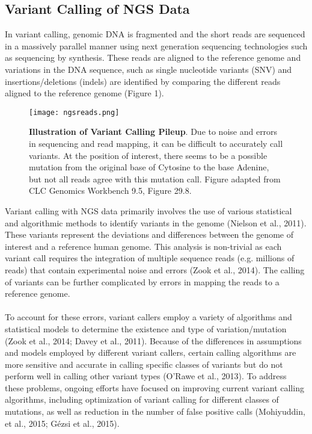\documentclass{article}
\begin{document}
\subsection{Variant Calling of NGS Data}
In variant calling, genomic DNA is fragmented and the short reads are sequenced in a massively parallel manner using next generation sequencing technologies such as sequencing by synthesis. These reads  are aligned to the reference genome and variations in the DNA sequence, such as single nucleotide variants (SNV) and insertions/deletions (indels) are identified by comparing the different reads aligned to the reference genome (Figure 1).
\begin{figure}[H]
\texttt{[image: ngsreads.png]}
\centering
\caption{ \textbf{Illustration of Variant Calling Pileup}. Due to noise and errors in sequencing and read mapping, it can be difficult to accurately call variants. At the position of interest, there seems to be a possible mutation from the original base of Cytosine to the base Adenine, but not all reads agree with this mutation call. Figure adapted from CLC Genomics Workbench 9.5, Figure 29.8.}
\end{figure}
Variant calling with NGS data primarily involves the use of various statistical and algorithmic methods to identify variants in the genome (Nielson et al., 2011). These variants represent the deviations and differences between the genome of interest and a reference human genome. This analysis is non-trivial as each variant call requires the integration of multiple sequence reads (e.g. millions of reads) that contain experimental noise and errors (Zook et al., 2014). The calling of variants can be further complicated by errors in mapping the reads to a reference genome. \\\\ To account for these errors, variant callers employ a variety of algorithms and statistical models to determine the existence and type of variation/mutation (Zook et al., 2014; Davey et al., 2011). Because of the differences in assumptions and models employed by different variant callers, certain calling algorithms are more sensitive and accurate in calling specific classes of variants but do not perform well in calling other variant types (O'Rawe et al., 2013). To address these problems, ongoing efforts have focused on improving current variant calling algorithms, including optimization of variant calling for different classes of mutations, as well as reduction in the number of false positive calls (Mohiyuddin, et al., 2015; Gézsi et al., 2015). 
\end{document}
